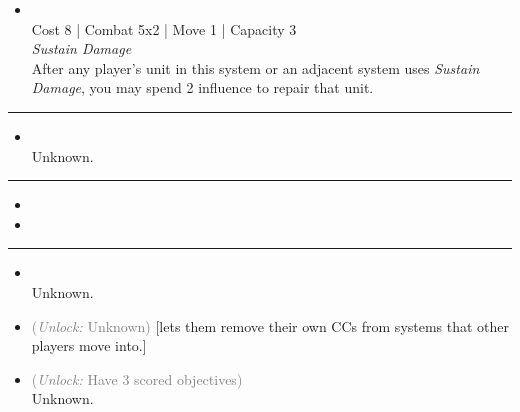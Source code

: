 \begin{multicols}{2}

\begin{itemize}
\item {}\\
Cost 8 | Combat 5x2 | Move 1 | Capacity 3 \\
\emph{Sustain Damage}\\
After any player's unit in this system or an adjacent system uses \emph{Sustain Damage}, you may spend 2 influence to repair that unit.
\end{itemize}

\vspace{-10pt}\rule{\hsize}{0.4pt}\vspace{5pt}


\begin{itemize}
\item {}
\\
Unknown.
\end{itemize}

\vspace{-10pt}\rule{\hsize}{0.4pt}\vspace{5pt}

\nounits

\columnbreak
{}

\begin{itemize}
\item \aetherstream
\item \voidwatch
\end{itemize}

\vspace{-10pt}\rule{\hsize}{0.4pt}\vspace{5pt}


\begin{itemize}
\item {}\\
Unknown.
\item {} \textcolor{gray}{(\emph{Unlock:} Unknown)} %
[lets them remove their own CCs from systems that other players move into.] %
\item {} \textcolor{gray}{(\emph{Unlock:} Have 3 scored objectives)}\\
Unknown.
\end{itemize}


\end{multicols}
